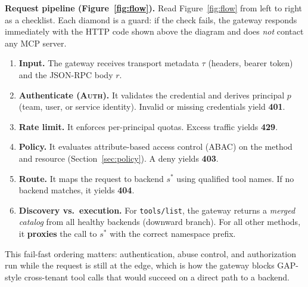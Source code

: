 \documentclass[11pt]{article}
\newcommand{\code}[1]{\texttt{#1}}
\begin{document}
\textbf{Request pipeline (Figure~\ref{fig:flow}).}
Read Figure~\ref{fig:flow} from left to right as a checklist.
Each diamond is a guard: if the check fails, the gateway responds immediately with the HTTP code shown above the diagram and does \emph{not} contact any MCP server.
\begin{enumerate}[leftmargin=*, itemsep=0.2em]
  \item \textbf{Input.} The gateway receives transport metadata $\tau$ (headers, bearer token) and the JSON-RPC body $r$.
  \item \textbf{Authenticate (\textsc{Auth}).} It validates the credential and derives principal $p$ (team, user, or service identity). Invalid or missing credentials yield \textbf{401}.
  \item \textbf{Rate limit.} It enforces per-principal quotas. Excess traffic yields \textbf{429}.
  \item \textbf{Policy.} It evaluates attribute-based access control (ABAC) on the method and resource (Section~\ref{sec:policy}). A deny yields \textbf{403}.
  \item \textbf{Route.} It maps the request to backend $s^*$ using qualified tool names. If no backend matches, it yields \textbf{404}.
  \item \textbf{Discovery vs.\ execution.} For \code{tools/list}, the gateway returns a \emph{merged catalog} from all healthy backends (downward branch). For all other methods, it \textbf{proxies} the call to $s^*$ with the correct namespace prefix.
\end{enumerate}
This fail-fast ordering matters: authentication, abuse control, and authorization run while the request is still at the edge, which is how the gateway blocks GAP-style cross-tenant tool calls that would succeed on a direct path to a backend.
\end{document}

